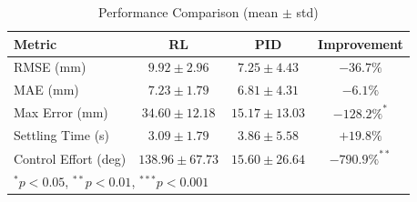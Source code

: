 \begin{table}[h]
\centering
\caption{Performance Comparison (mean $\pm$ std)}
\label{tab:performance}
\begin{tabular}{lccc}
\hline
Metric & RL & PID & Improvement \\
\hline
RMSE (mm) & $9.92 \pm 2.96$ & $7.25 \pm 4.43$ & $-36.7\%$ \\
MAE (mm) & $7.23 \pm 1.79$ & $6.81 \pm 4.31$ & $-6.1\%$ \\
Max Error (mm) & $34.60 \pm 12.18$ & $15.17 \pm 13.03$ & $-128.2\%^{*}$ \\
Settling Time (s) & $3.09 \pm 1.79$ & $3.86 \pm 5.58$ & $+19.8\%$ \\
Control Effort (deg) & $138.96 \pm 67.73$ & $15.60 \pm 26.64$ & $-790.9\%^{**}$ \\
\hline
\multicolumn{4}{l}{\footnotesize $^{*}p<0.05$, $^{**}p<0.01$, $^{***}p<0.001$} \\
\end{tabular}
\end{table}